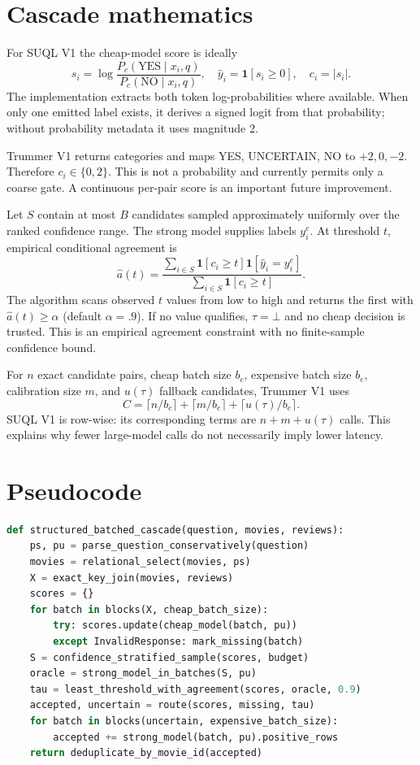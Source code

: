 \section{Cascade mathematics}
For SUQL V1 the cheap-model score is ideally
\[
s_i=\log\frac{P_c(\mathrm{YES}\mid x_i,q)}{P_c(\mathrm{NO}\mid x_i,q)},
\quad \hat y_i=\mathbf1[s_i\ge0],\quad c_i=|s_i|.
\]
The implementation extracts both token log-probabilities where available. When
only one emitted label exists, it derives a signed logit from that probability;
without probability metadata it uses magnitude 2.

Trummer V1 returns categories and maps YES, UNCERTAIN, NO to $+2,0,-2$. Therefore
$c_i\in\{0,2\}$. This is not a probability and currently permits only a coarse
gate. A continuous per-pair score is an important future improvement.

Let $S$ contain at most $B$ candidates sampled approximately uniformly over the
ranked confidence range. The strong model supplies labels $y_i^e$. At threshold
$t$, empirical conditional agreement is
\[
\widehat a(t)=\frac{\sum_{i\in S}\mathbf1[c_i\ge t]\mathbf1[\hat y_i=y_i^e]}
{\sum_{i\in S}\mathbf1[c_i\ge t]}.
\]
The algorithm scans observed $t$ values from low to high and returns the first
with $\widehat a(t)\ge\alpha$ (default $\alpha=.9$). If no value qualifies,
$\tau=\bot$ and no cheap decision is trusted. This is an empirical agreement
constraint with no finite-sample confidence bound.

For $n$ exact candidate pairs, cheap batch size $b_c$, expensive batch size $b_e$,
calibration size $m$, and $u(\tau)$ fallback candidates, Trummer V1 uses
\[
C=\lceil n/b_c\rceil+\lceil m/b_e\rceil+\lceil u(\tau)/b_e\rceil.
\]
SUQL V1 is row-wise: its corresponding terms are $n+m+u(\tau)$ calls. This explains
why fewer large-model calls do not necessarily imply lower latency.

\section{Pseudocode}
\begin{lstlisting}[language=Python]
def structured_batched_cascade(question, movies, reviews):
    ps, pu = parse_question_conservatively(question)
    movies = relational_select(movies, ps)
    X = exact_key_join(movies, reviews)
    scores = {}
    for batch in blocks(X, cheap_batch_size):
        try: scores.update(cheap_model(batch, pu))
        except InvalidResponse: mark_missing(batch)
    S = confidence_stratified_sample(scores, budget)
    oracle = strong_model_in_batches(S, pu)
    tau = least_threshold_with_agreement(scores, oracle, 0.9)
    accepted, uncertain = route(scores, missing, tau)
    for batch in blocks(uncertain, expensive_batch_size):
        accepted += strong_model(batch, pu).positive_rows
    return deduplicate_by_movie_id(accepted)
\end{lstlisting}
